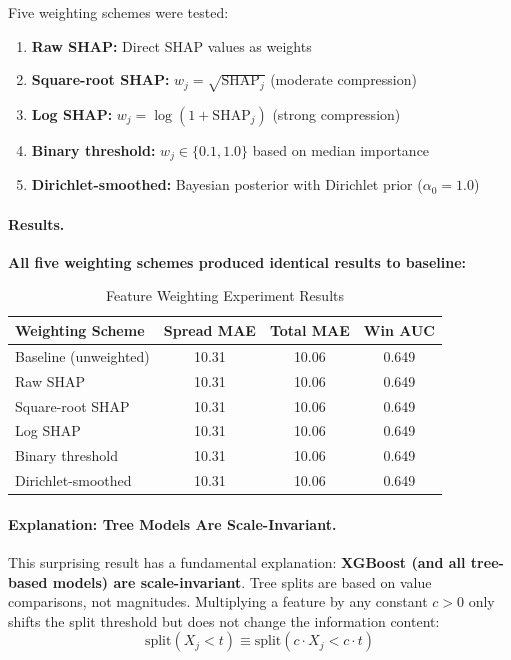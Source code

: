 Five weighting schemes were tested:
\begin{enumerate}[itemsep=2pt,parsep=0pt]
    \item \textbf{Raw SHAP:} Direct SHAP values as weights
    \item \textbf{Square-root SHAP:} $w_j = \sqrt{\text{SHAP}_j}$ (moderate compression)
    \item \textbf{Log SHAP:} $w_j = \log(1 + \text{SHAP}_j)$ (strong compression)
    \item \textbf{Binary threshold:} $w_j \in \{0.1, 1.0\}$ based on median importance
    \item \textbf{Dirichlet-smoothed:} Bayesian posterior with Dirichlet prior ($\alpha_0 = 1.0$)
\end{enumerate}

\paragraph{Results.}
\textbf{All five weighting schemes produced identical results to baseline:}

\begin{table}[htbp]
\centering
\caption{Feature Weighting Experiment Results}
\label{tab:feature-weighting-results}
\small
\begin{tabular}{@{} l S[table-format=2.2] S[table-format=2.2] S[table-format=1.3] @{}}
\toprule
\textbf{Weighting Scheme} & \textbf{Spread MAE} & \textbf{Total MAE} & \textbf{Win AUC} \\
\midrule
Baseline (unweighted) & 10.31 & 10.06 & 0.649 \\
Raw SHAP & 10.31 & 10.06 & 0.649 \\
Square-root SHAP & 10.31 & 10.06 & 0.649 \\
Log SHAP & 10.31 & 10.06 & 0.649 \\
Binary threshold & 10.31 & 10.06 & 0.649 \\
Dirichlet-smoothed & 10.31 & 10.06 & 0.649 \\
\bottomrule
\end{tabular}
\end{table}

\paragraph{Explanation: Tree Models Are Scale-Invariant.}
This surprising result has a fundamental explanation: \textbf{XGBoost (and all tree-based models) are scale-invariant}. Tree splits are based on value comparisons, not magnitudes. Multiplying a feature by any constant $c > 0$ only shifts the split threshold but does not change the information content:
\begin{equation}
    \text{split}(X_j < t) \equiv \text{split}(c \cdot X_j < c \cdot t)
\end{equation}

